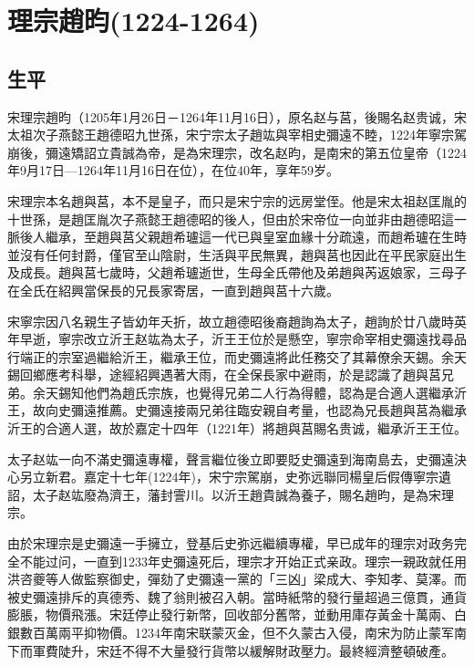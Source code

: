 
\section{理宗趙昀\tiny(1224-1264)}

\subsection{生平}

宋理宗趙昀（1205年1月26日－1264年11月16日），原名赵与莒，後賜名赵贵诚，宋太祖次子燕懿王趙德昭九世孫，宋宁宗太子趙竑與宰相史彌遠不睦，1224年寧宗駕崩後，彌遠矯詔立貴誠為帝，是為宋理宗，改名赵昀，是南宋的第五位皇帝（1224年9月17日—1264年11月16日在位），在位40年，享年59岁。

宋理宗本名趙與莒，本不是皇子，而只是宋宁宗的远房堂侄。他是宋太祖赵匡胤的十世孫，是趙匡胤次子燕懿王趙德昭的後人，但由於宋帝位一向並非由趙德昭這一脈後人繼承，至趙與莒父親趙希瓐這一代已與皇室血緣十分疏遠，而趙希瓐在生時並沒有任何封爵，僅官至山陰尉，生活與平民無異，趙與莒也因此在平民家庭出生及成長。趙與莒七歲時，父趙希瓐逝世，生母全氏帶他及弟趙與芮返娘家，三母子在全氏在紹興當保長的兄長家寄居，一直到趙與莒十六歲。

宋寧宗因八名親生子皆幼年夭折，故立趙德昭後裔趙詢為太子，趙詢於廿八歲時英年早逝，寧宗改立沂王赵竑為太子，沂王王位於是懸空，寧宗命宰相史彌遠找尋品行端正的宗室過繼給沂王，繼承王位，而史彌遠將此任務交了其幕僚余天錫。余天錫回鄉應考科舉，途經紹興遇著大雨，在全保長家中避雨，於是認識了趙與莒兄弟。余天錫知他們為趙氏宗族，也覺得兄弟二人行為得體，認為是合適人選繼承沂王，故向史彌遠推薦。史彌遠接兩兄弟往臨安親自考量，也認為兄長趙與莒為繼承沂王的合適人選，故於嘉定十四年（1221年）將趙與莒賜名贵诚，繼承沂王王位。

太子赵竑一向不滿史彌遠專權，聲言繼位後立即要貶史彌遠到海南島去，史彌遠決心另立新君。嘉定十七年(1224年)，宋宁宗駕崩，史弥远聯同楊皇后假傳寧宗遺詔，太子赵竑廢為濟王，藩封霅川。以沂王趙貴誠為養子，賜名趙昀，是為宋理宗。

由於宋理宗是史彌遠一手擁立，登基后史弥远繼續專權，早已成年的理宗对政务完全不能过问，一直到1233年史彌遠死后，理宗才开始正式亲政。理宗一親政就任用洪咨夔等人做監察御史，彈劾了史彌遠一黨的「三凶」梁成大、李知孝、莫澤。而被史彌遠排斥的真德秀、魏了翁則被召入朝。當時紙幣的發行量超過三億貫，通貨膨脹，物價飛漲。宋廷停止發行新幣，回收部分舊幣，並動用庫存黃金十萬兩、白銀數百萬兩平抑物價。1234年南宋联蒙灭金，但不久蒙古入侵，南宋为防止蒙军南下而軍費陡升，宋廷不得不大量發行貨幣以緩解財政壓力。最終經濟整頓破產。

